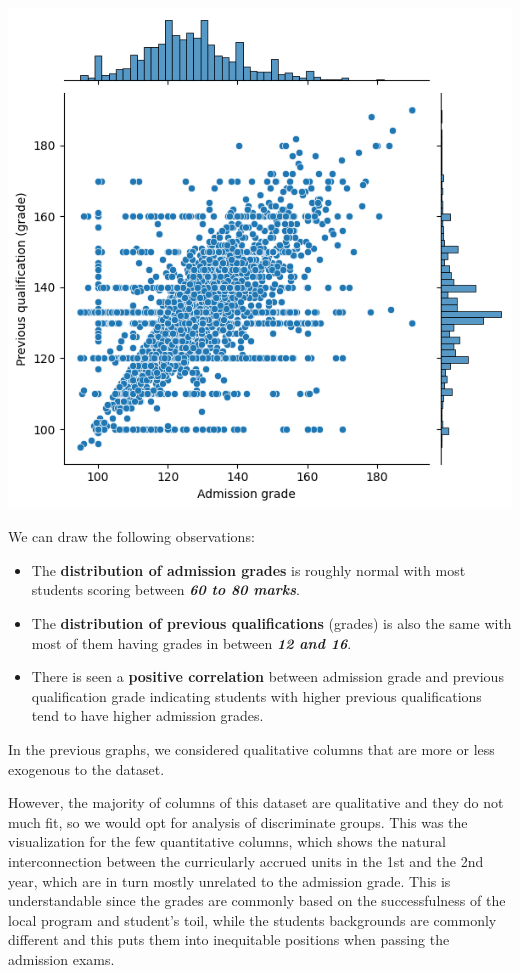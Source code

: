 \documentclass[
  letterpaper,
  DIV=11,
  numbers=noendperiod]{scrartcl}
\begin{document}
\includegraphics{report_AzadhdhinNedalYunisAlFraijat_files/figure-pdf/cell-10-output-1.png}

We can draw the following observations:

\begin{itemize}
\item
  The \textbf{distribution of admission grades} is roughly normal with
  most students scoring between \textbf{\emph{60 to 80 marks}}.
\item
  The \textbf{distribution of previous qualifications} (grades) is also
  the same with most of them having grades in between \textbf{\emph{12
  and 16}}.
\item
  There is seen a \textbf{positive correlation} between admission grade
  and previous qualification grade indicating students with higher
  previous qualifications tend to have higher admission grades.
\end{itemize}

In the previous graphs, we considered qualitative columns that are more
or less exogenous to the dataset.

However, the majority of columns of this dataset are qualitative and
they do not much fit, so we would opt for analysis of discriminate
groups. This was the visualization for the few quantitative columns,
which shows the natural interconnection between the curricularly accrued
units in the 1st and the 2nd year, which are in turn mostly unrelated to
the admission grade. This is understandable since the grades are
commonly based on the successfulness of the local program and student's
toil, while the students backgrounds are commonly different and this
puts them into inequitable positions when passing the admission exams.
\end{document}
